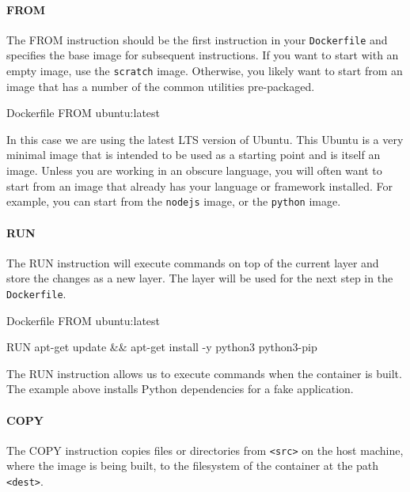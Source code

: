 \documentclass{csse4400}
\begin{document}
\paragraph{FROM}
The FROM instruction should be the first instruction in your \texttt{Dockerfile} and specifies the base image for subsequent instructions.
If you want to start with an empty image, use the \texttt{scratch} image.
Otherwise, you likely want to start from an image that has a number of the common utilities pre-packaged.

\begin{code}[language=docker,numbers=none]{Dockerfile}
FROM ubuntu:latest
\end{code}

In this case we are using the latest LTS version of Ubuntu.
This Ubuntu is a very minimal image that is intended to be used as a starting point and is itself an image.
Unless you are working in an obscure language,
you will often want to start from an image that already has your language or framework installed.
For example, you can start from the \texttt{nodejs} image, or the \texttt{python} image.


\paragraph{RUN}
The RUN instruction will execute commands on top of the current layer and store the changes as a new layer.
The layer will be used for the next step in the \texttt{Dockerfile}.

\begin{code}[language=docker,numbers=none]{Dockerfile}
FROM ubuntu:latest

RUN apt-get update && apt-get install -y python3 python3-pip
\end{code}

The RUN instruction allows us to execute commands when the container is built.
The example above installs Python dependencies for a fake application.

\paragraph{COPY}
The COPY instruction copies files or directories from \texttt{<src>} on the host machine,
 where the image is being built, to the filesystem of the container at the path \texttt{<dest>}.
\end{document}
